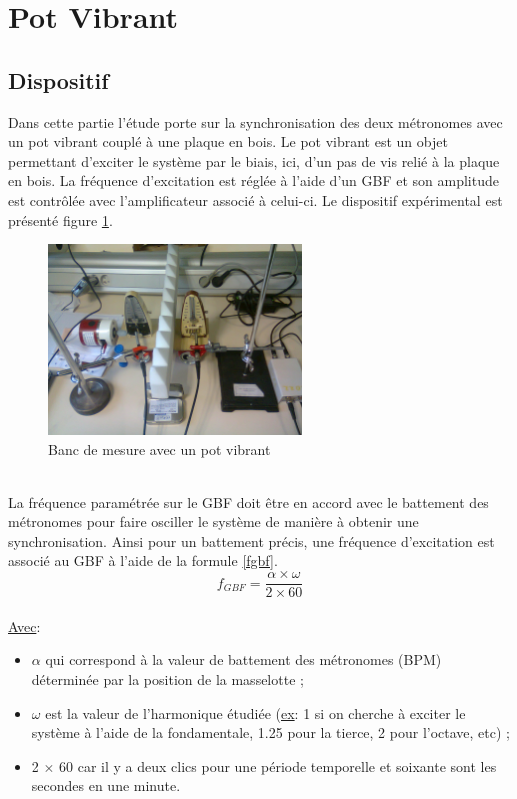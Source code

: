 \documentclass[a4paper,11pt]{report}
\begin{document}
\section{Pot Vibrant}

\subsection{Dispositif}
Dans cette partie l'étude porte sur la synchronisation des deux métronomes avec un pot vibrant couplé à une plaque en bois. Le pot vibrant est un objet permettant d'exciter le système par le biais, ici, d'un pas de vis relié à la plaque en bois. La fréquence d'excitation est réglée à l'aide d'un GBF et son amplitude est contrôlée avec l'amplificateur associé à celui-ci. Le dispositif expérimental est présenté figure \ref{BancPot}.
\begin{figure}[h]
\centering
\includegraphics[width=0.6\textwidth]{Bancpotvibrant}
\caption{Banc de mesure avec un pot vibrant}\label{BancPot}
\end{figure}\\
La fréquence paramétrée sur le GBF doit être en accord avec le battement des métronomes pour faire osciller le système de manière à obtenir une synchronisation. Ainsi pour un battement précis, une fréquence d'excitation est associé au GBF à l'aide de la formule \ref{fgbf}.\\

\begin{equation}
f_{GBF}=\frac{\alpha \times \omega}{2 \times 60}
\label{fgbf}
\end{equation}
\\
\underline{Avec}:\\
\begin{itemize}[label=\textbullet, leftmargin=* ,parsep=0cm,itemsep=0cm,topsep=0cm,font=\tiny]
\item $\alpha$ qui correspond à la valeur de battement des métronomes (BPM) déterminée par la position de la masselotte ;
\item $\omega$ est la valeur de l'harmonique étudiée (\underline{ex}: 1 si on cherche à exciter le système à l'aide de la fondamentale, 1.25 pour la tierce, 2 pour l'octave, etc) ;
\item 2 $\times$ 60 car il y a deux clics pour une période temporelle et soixante sont les secondes en une minute.\\
\end{itemize}
\end{document}
